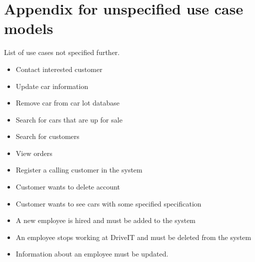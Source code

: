 \section{Appendix for unspecified use case models}
\label{sec:unspecified-use-case-models}

List of use cases not specified further.
\begin{itemize}
    \item Contact interested customer
    \item Update car information
    \item Remove car from car lot database
    \item Search for cars that are up for sale
    \item Search for customers
    \item View orders
    \item Register a calling customer in the system
    \item Customer wants to delete account
    \item Customer wants to see cars with some specified specification
    \item A new employee is hired and must be added to the system
    \item An employee stops working at DriveIT and must be deleted from the system
    \item Information about an employee must be updated.
\end{itemize}
